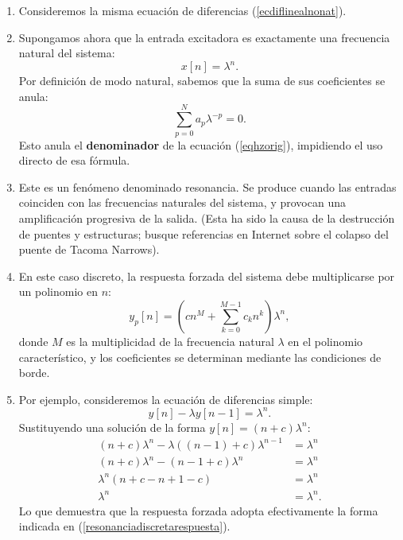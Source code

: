 \begin{enumerate}
	\item Consideremos la misma ecuaci\'{o}n de diferencias (\ref{ecdiflinealnonat}).
	\item Supongamos ahora que la entrada excitadora es exactamente una frecuencia natural del sistema:
	\begin{equation}
		x[n] = \lambda^{n}.
	\end{equation}
	Por definición de modo natural, sabemos que la suma de sus coeficientes se anula:
	\begin{equation}
		\sum_{p=0}^{N}a_{p} \lambda^{-p} = 0.
	\end{equation}
	Esto anula el \textbf{denominador} de la ecuación (\ref{eqhzorig}), impidiendo el uso directo de esa fórmula.
	
	\item Este es un fen\'{o}meno denominado resonancia. Se produce cuando las entradas coinciden con las frecuencias naturales del sistema, y provocan una amplificaci\'{o}n progresiva de la salida. (Esta ha sido la causa de la destrucci\'{o}n de puentes y estructuras; busque referencias en Internet sobre el colapso del puente de Tacoma Narrows).
	
	\item En este caso discreto, la respuesta forzada del sistema debe multiplicarse por un polinomio en $n$:
	\begin{equation}
		y_{p}[n] = \left( c n^{M} + \sum_{k=0}^{M-1} c_{k} n^{k} \right) \lambda^{n}, \label{resonanciadiscreta}
	\end{equation}
	donde $M$ es la multiplicidad de la frecuencia natural $\lambda$ en el polinomio característico, y los coeficientes se determinan mediante las condiciones de borde.
	
	\item Por ejemplo, consideremos la ecuaci\'{o}n de diferencias simple:
	\begin{equation}
		y[n] - \lambda y[n-1] = \lambda^{n}.
	\end{equation}
	Sustituyendo una solución de la forma $y[n] = (n + c) \lambda^{n}$:
	\begin{align}
		(n + c) \lambda^{n} - \lambda ((n - 1) + c) \lambda^{n-1} &= \lambda^{n} \\
		(n + c) \lambda^{n} - (n - 1 + c) \lambda^{n} &= \lambda^{n} \\
		\lambda^{n} (n + c - n + 1 - c) &= \lambda^{n} \\
		\lambda^{n} &= \lambda^{n}.
	\end{align}
	Lo que demuestra que la respuesta forzada adopta efectivamente la forma indicada en (\ref{resonanciadiscretarespuesta}).
\end{enumerate}

